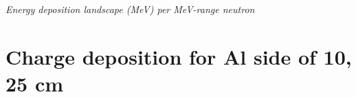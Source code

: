 \documentclass[11pt]{article}
\makeatletter
\newenvironment{figurehere}
{\def\@captype{figure}}{}
\makeatother
\begin{document}
\begin{multicols}{2}
\vspace{0.15 cm}
\begin{figurehere}
\centering
{}
\caption{\small \emph{Energy deposition landscape (MeV) per MeV-range neutron}}
\label{fig:nEDep_Al25_MeV}
\end{figurehere}
\vspace{0.2 cm}

\end{multicols}
\newpage
\section{Charge deposition for Al side of 10, 25 cm}\label{app:ChargeDep}
\end{document}
